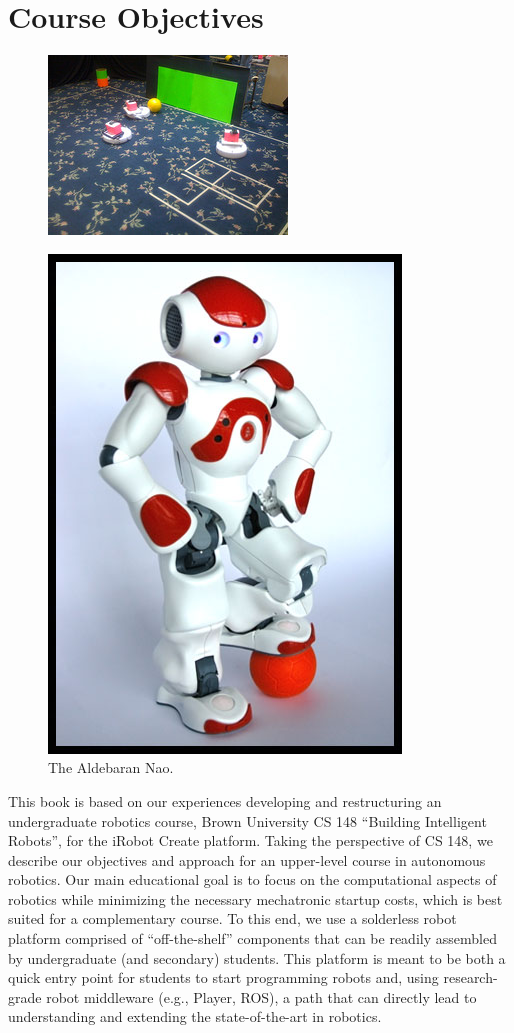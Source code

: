 
\chapter{Course Objectives}

\begin{figure}[!h]
\centering
\includegraphics[width=0.8\columnwidth]{figures/1_teaser.jpg}
\end{figure}

\newpage

\begin{figure}
\includegraphics[width=0.3\columnwidth]{figures/1_Nao.jpg}
\caption{The Aldebaran Nao.}
\label{fig:1_Nao}
\end{figure}

This book is based on our experiences developing and restructuring an undergraduate robotics course, Brown University CS 148 ``Building Intelligent Robots'', for the iRobot Create platform.  Taking the perspective of CS 148, we describe our objectives and approach for an upper-level course in autonomous robotics.  Our main educational goal is to focus on the computational aspects of robotics while minimizing the necessary mechatronic startup costs, which is best suited for a complementary course.  To this end, we use a solderless robot platform comprised of ``off-the-shelf'' components that can be readily assembled by undergraduate (and secondary) students.  This platform is meant to be both a quick entry point for students to start programming robots and, using research-grade robot middleware (e.g., Player, ROS), a path that can directly lead to understanding and extending the state-of-the-art in robotics.

